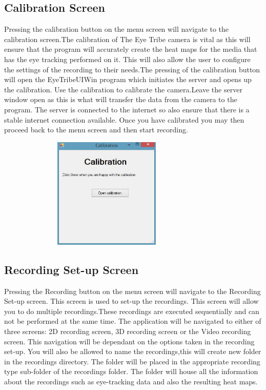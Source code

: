 \subsection{Calibration Screen}
Pressing the calibration button on the menu screen will navigate to the calibration screen.The calibration of The Eye Tribe camera is vital as this will ensure that the program will accurately create the heat maps for the media that has the eye tracking performed on it. This will also allow the user to configure the settings of the recording to their needs.The pressing of the calibration button will open the EyeTribeUIWin program which initiates the server and opens up the calibration. Use the calibration to calibrate the camera.Leave the server window open as this is what will transfer the data from the camera to the program. The server is connected to the internet so also ensure that there is a stable internet connection available. Once you have calibrated you may then proceed back to the menu screen and then start recording.

\includegraphics[width=400px,height=200px]{./Images/CalibrationStarter.JPG}

\subsection{Recording Set-up Screen}
Pressing the Recording button on the menu screen will navigate to the Recording Set-up screen. This screen is used to set-up the recordings. This screen will allow you to do multiple recordings.These recordings are executed sequentially and can not be performed at the same time.
The application will be navigated to either of three screens: 2D recording screen, 3D recording screen or the Video recording screen. This navigation will be dependant on the options taken in the recording set-up.
You will also be allowed to name the recordings,this will create new folder in the recordings directory. The folder will be placed in the appropriate recording type sub-folder of the recordings folder. The folder will house all the information about the recordings such as eye-tracking data and also the resulting heat maps.

